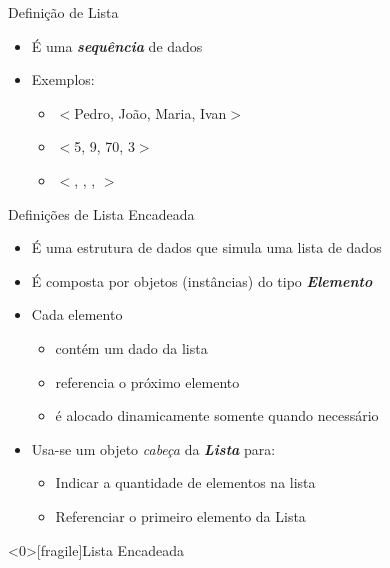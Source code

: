 \documentclass[12pt,table,xcolor={dvipsnames}]{beamer}
\begin{document}
\begin{frame}[fragile]{Definição de Lista}
	\begin{itemize}
		\item É uma \textit{\textbf{sequência}} de dados
		\item Exemplos:
		\begin{itemize}
			\item $<$Pedro, João, Maria, Ivan$>$
			\item $<$5, 9, 70, 3$>$
			\item $<$\smiley, \phone, \davidsstar, \twonotes$>$
		\end{itemize}
	\end{itemize}
\end{frame}

\begin{frame}[fragile]{Definições de Lista Encadeada}
\begin{itemize}
\item É uma estrutura de dados que simula uma lista de dados
\item É composta por objetos (instâncias) do tipo \textbf{\textit{Elemento}}
\item Cada elemento 
\begin{itemize}
\item contém um dado da lista 
\item referencia o próximo elemento
\item é alocado dinamicamente somente quando necessário
\end{itemize}
\item Usa-se um objeto \textit{cabeça} da \textbf{\textit{Lista}} para:
\begin{itemize}
	\item Indicar a quantidade de elementos na lista
	\item Referenciar o primeiro elemento da Lista
\end{itemize}
\end{itemize}
\end{frame}


\begin{frame}<0>[fragile]{Lista Encadeada}
\begin{center}
\end{center}
\end{frame}
\end{document}
